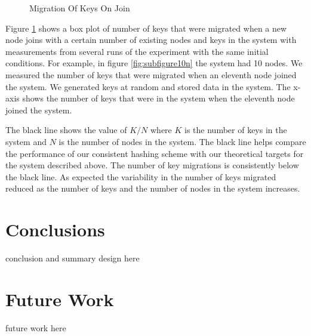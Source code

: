 \documentclass[10pt,twocolumn,letterpaper]{article}
\begin{document}
\begin{figure}[ht]
\caption{Migration Of Keys On Join}
\label{fig:conhashing}
\end{figure}

Figure \ref{fig:conhashing} shows a box plot of number of keys that were migrated when a new node joins with a certain number of existing nodes and keys in the system with measurements from several runs of the experiment with the same initial conditions. For example, in figure \ref{fig:subfigure10n} the system had 10 nodes. We measured the number of keys that were migrated when an eleventh node joined the system. We generated keys at random and stored data in the system. The x-axis shows the number of keys that were in the system when the eleventh node joined the system. 

The black line shows the value of \(K/N\) where \(K\) is the number of keys in the system and \(N\) is the number of nodes in the system. The black line helps compare the performance of our consistent hashing scheme with our theoretical targets for the system described above. The number of key migrations is consistently below the black line. As expected the variability in the number of keys migrated reduced as the number of keys and the number of nodes in the system increases.

\section{Conclusions} \label{conclusions}
conclusion and summary design here

\section{Future Work} \label{futurework}
future work here
\end{document}
